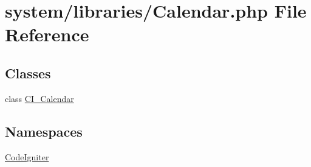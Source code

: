 \hypertarget{_calendar_8php}{}\section{system/libraries/\+Calendar.php File Reference}
\label{_calendar_8php}
\subsection*{Classes}
\begin{DoxyCompactItemize}
\item 
class \mbox{\hyperlink{class_c_i___calendar}{C\+I\+\_\+\+Calendar}}
\end{DoxyCompactItemize}
\subsection*{Namespaces}
\begin{DoxyCompactItemize}
\item 
 \mbox{\hyperlink{namespace_code_igniter}{Code\+Igniter}}
\end{DoxyCompactItemize}
